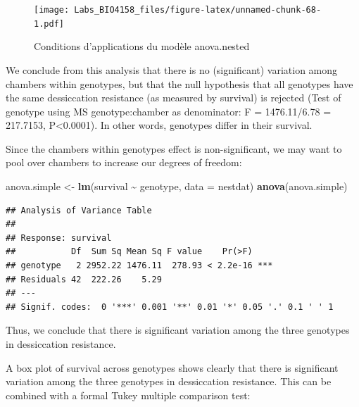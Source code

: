 \documentclass[
  12pt,
]{book}
\newenvironment{Shaded}{\begin{snugshade}}{\end{snugshade}}
\newcommand{\DataTypeTok}[1]{\textcolor[rgb]{0.13,0.29,0.53}{#1}}
\newcommand{\KeywordTok}[1]{\textcolor[rgb]{0.13,0.29,0.53}{\textbf{#1}}}
\newcommand{\NormalTok}[1]{#1}
\newcommand{\OperatorTok}[1]{\textcolor[rgb]{0.81,0.36,0.00}{\textbf{#1}}}
\newcommand{\StringTok}[1]{\textcolor[rgb]{0.31,0.60,0.02}{#1}}
\begin{document}
\begin{figure}
\centering
\texttt{[image: Labs\_BIO4158\_files/figure-latex/unnamed-chunk-68-1.pdf]}
\caption{\label{fig:unnamed-chunk-68}Conditions d'applications du modèle anova.nested}
\end{figure}

We conclude from this analysis that there is no (significant) variation among chambers within genotypes, but that the null hypothesis that all genotypes have the same dessiccation resistance (as measured by survival) is rejected (Test of genotype using MS genotype:chamber as denominator: F = 1476.11/6.78 = 217.7153, P\textless0.0001). In other words, genotypes differ in their survival.

Since the chambers within genotypes effect is non-significant, we may want to pool over chambers to increase our degrees of freedom:

\begin{Shaded}
\begin{Highlighting}[]
\NormalTok{anova.simple \textless{}{-}}\StringTok{ }\KeywordTok{lm}\NormalTok{(survival }\OperatorTok{\textasciitilde{}}\StringTok{ }\NormalTok{genotype, }\DataTypeTok{data =}\NormalTok{ nestdat)}
\KeywordTok{anova}\NormalTok{(anova.simple)}
\end{Highlighting}
\end{Shaded}

\begin{verbatim}
## Analysis of Variance Table
## 
## Response: survival
##           Df  Sum Sq Mean Sq F value    Pr(>F)    
## genotype   2 2952.22 1476.11  278.93 < 2.2e-16 ***
## Residuals 42  222.26    5.29                      
## ---
## Signif. codes:  0 '***' 0.001 '**' 0.01 '*' 0.05 '.' 0.1 ' ' 1
\end{verbatim}

Thus, we conclude that there is significant variation among the three genotypes in dessiccation resistance.

A box plot of survival across genotypes shows clearly that there is significant variation among the three genotypes in dessiccation resistance. This can be combined with a formal Tukey multiple comparison test:
\end{document}
